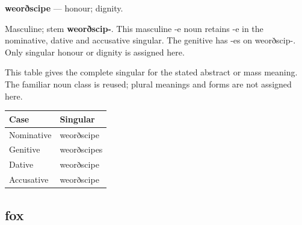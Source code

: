 \par\begin{minipage}{\linewidth}\raggedright
\textbf{weorðscipe} — honour; dignity.

Masculine; stem \textbf{weorðscip-}. This masculine -e noun retains -e in the nominative, dative and accusative singular. The genitive has -es on weorðscip-. Only singular honour or dignity is assigned here.

This table gives the complete singular for the stated abstract or mass meaning. The familiar noun class is reused; plural meanings and forms are not assigned here.

\par\begingroup
\fontsize{10.5}{13.2}\selectfont
\setlength{\LTleft}{0pt}\setlength{\LTright}{\fill}
\noindent
\begin{tabular}{@{}>{\raggedright\arraybackslash}p{57.71mm}>{\raggedright\arraybackslash}p{63.48mm}@{}}
\toprule
\textbf{Case} & \textbf{Singular} \\
\midrule
Nominative & weorðscipe \\
Genitive & weorðscipes \\
Dative & weorðscipe \\
Accusative & weorðscipe \\
\bottomrule
\end{tabular}
\par\endgroup

\end{minipage}\par
{}
\subsection*{fox}

